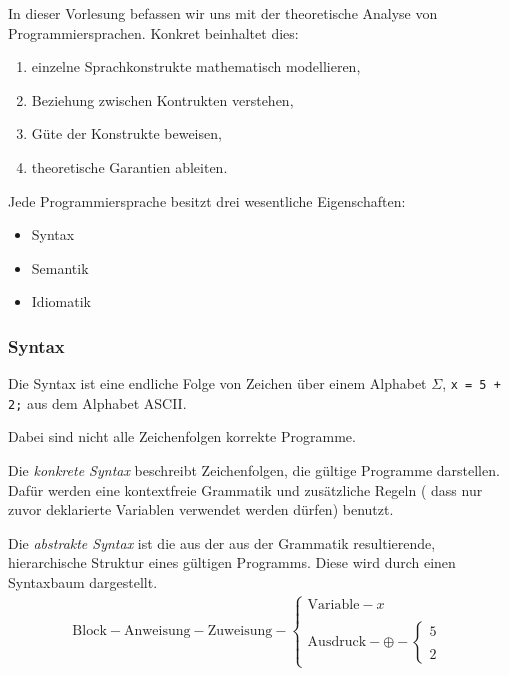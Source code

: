 \par\bigskip
In dieser Vorlesung befassen wir uns mit der theoretische Analyse von Programmiersprachen. Konkret beinhaltet dies:
\begin{enumerate}
    \item einzelne Sprachkonstrukte mathematisch modellieren,
    \item Beziehung zwischen Kontrukten verstehen,
    \item Güte der Konstrukte beweisen,
    \item theoretische Garantien ableiten.
\end{enumerate}

\par\bigskip
Jede Programmiersprache besitzt drei wesentliche Eigenschaften:
\begin{itemize}
    \item Syntax
    \item Semantik
    \item Idiomatik
\end{itemize}



\subsubsection{Syntax}

Die Syntax ist eine endliche Folge von Zeichen über einem Alphabet $\Sigma$, \zb{} \texttt{x = 5 + 2;} aus dem Alphabet ASCII.

Dabei sind nicht alle Zeichenfolgen korrekte Programme.

Die \emph{konkrete Syntax} beschreibt Zeichenfolgen, die gültige Programme darstellen. Dafür werden eine kontextfreie Grammatik und zusätzliche Regeln (\zb{} dass nur zuvor deklarierte Variablen verwendet werden dürfen) benutzt.

Die \emph{abstrakte Syntax} ist die aus der aus der Grammatik resultierende, hierarchische Struktur eines gültigen Programms. Diese wird durch einen Syntaxbaum dargestellt.
\begin{align*}
    \text{Block} - \text{Anweisung} - \text{Zuweisung} - \begin{cases}
        \text{Variable} - x \\
        \\
        \text{Ausdruck} - \oplus - \begin{cases}
            5 \\
            \\
            2
        \end{cases}
    \end{cases}
\end{align*}

